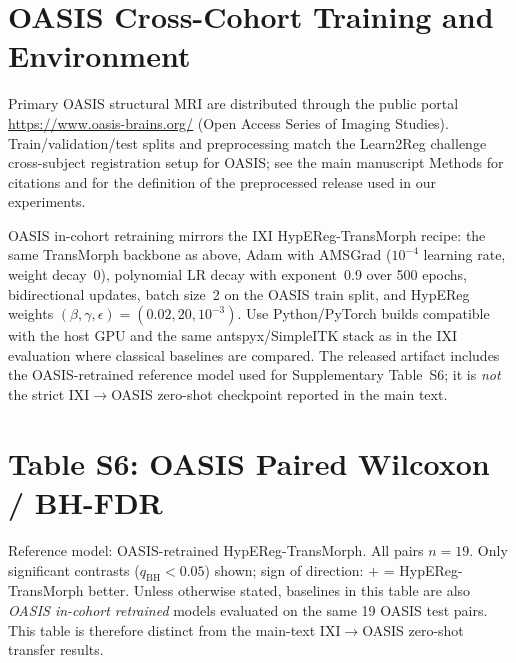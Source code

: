 \documentclass[11pt,a4paper]{article}
\begin{document}
\section{OASIS Cross-Cohort Training and Environment}
\noindent Primary OASIS structural MRI are distributed through the public portal \url{https://www.oasis-brains.org/} (Open Access Series of Imaging Studies). Train/validation/test splits and preprocessing match the Learn2Reg challenge cross-subject registration setup for OASIS; see the main manuscript Methods for citations and for the definition of the preprocessed release used in our experiments.

\noindent OASIS in-cohort retraining mirrors the IXI HypEReg-TransMorph recipe: the same TransMorph backbone as above, Adam with AMSGrad ($10^{-4}$ learning rate, weight decay~0), polynomial LR decay with exponent~0.9 over 500 epochs, bidirectional updates, batch size~2 on the OASIS train split, and HypEReg weights $(\beta,\gamma,\epsilon)=(0.02,20,10^{-3})$. Use Python/PyTorch builds compatible with the host GPU and the same antspyx/SimpleITK stack as in the IXI evaluation where classical baselines are compared. The released artifact includes the OASIS-retrained reference model used for Supplementary Table~S6; it is \emph{not} the strict IXI$\rightarrow$OASIS zero-shot checkpoint reported in the main text.

\section{Table S6: OASIS Paired Wilcoxon / BH-FDR}

\noindent Reference model: OASIS-retrained HypEReg-TransMorph. All pairs $n{=}19$. Only significant contrasts ($q_{\mathrm{BH}}<0.05$) shown; sign of direction: $+$ = HypEReg-TransMorph better.
\noindent Unless otherwise stated, baselines in this table are also \emph{OASIS in-cohort retrained} models evaluated on the same 19 OASIS test pairs. This table is therefore distinct from the main-text IXI\(\rightarrow\)OASIS zero-shot transfer results.
\end{document}
